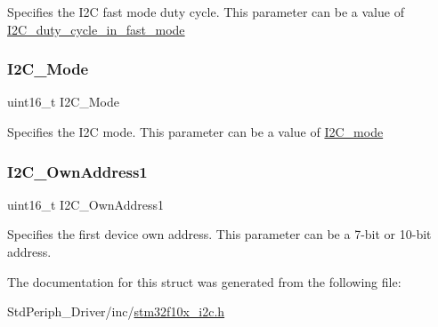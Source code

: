 Specifies the I2C fast mode duty cycle. This parameter can be a value of \mbox{\hyperlink{group___i2_c__duty__cycle__in__fast__mode}{I2\+C\+\_\+duty\+\_\+cycle\+\_\+in\+\_\+fast\+\_\+mode}} \mbox{\label{struct_i2_c___init_type_def_a165269b65702e348e32ccd8029e65af1}} 
\subsubsection{\texorpdfstring{I2C\_Mode}{I2C\_Mode}}
{\footnotesize\ttfamily uint16\+\_\+t I2\+C\+\_\+\+Mode}

Specifies the I2C mode. This parameter can be a value of \mbox{\hyperlink{group___i2_c__mode}{I2\+C\+\_\+mode}} \mbox{\label{struct_i2_c___init_type_def_ae62dca9cea4fdb3eb8f9554b5f35fe4f}} 
\subsubsection{\texorpdfstring{I2C\_OwnAddress1}{I2C\_OwnAddress1}}
{\footnotesize\ttfamily uint16\+\_\+t I2\+C\+\_\+\+Own\+Address1}

Specifies the first device own address. This parameter can be a 7-\/bit or 10-\/bit address. 

The documentation for this struct was generated from the following file\+:\begin{DoxyCompactItemize}
\item 
Std\+Periph\+\_\+\+Driver/inc/\mbox{\hyperlink{stm32f10x__i2c_8h}{stm32f10x\+\_\+i2c.\+h}}\end{DoxyCompactItemize}
